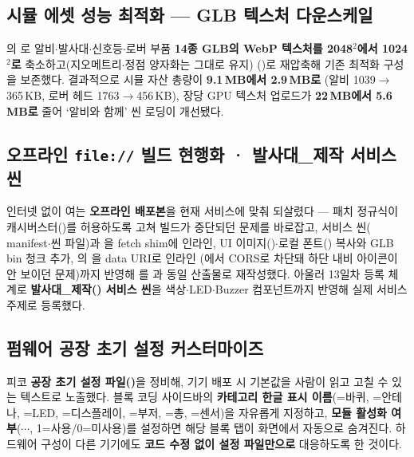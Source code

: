 \subsection{시뮬 에셋 성능 최적화 --- GLB 텍스처 다운스케일}
의 로 알비$\cdot$발사대$\cdot$신호등$\cdot$로버 부품
\textbf{14종 GLB의 WebP 텍스처를 2048$^2$에서 1024$^2$로} 축소하고(지오메트리$\cdot$정점
양자화는 그대로 유지) ()로 재압축해 기존
최적화 구성을 보존했다. 결과적으로 시뮬 자산 총량이 \textbf{9.1\,MB에서 2.9\,MB로}
(알비 1039$\to$365\,KB, 로버 헤드 1763$\to$456\,KB), 장당 GPU 텍스처 업로드가
\textbf{22\,MB에서 5.6\,MB로} 줄어 `알비와 함께' 씬 로딩이 개선됐다.

\subsection{오프라인 \texttt{file://} 빌드 현행화 · 발사대\_제작 서비스 씬}
인터넷 없이 여는 \textbf{오프라인 배포본}을 현재 서비스에 맞춰 되살렸다 --- 
패치 정규식이 캐시버스터()를 허용하도록 고쳐 빌드가 중단되던 문제를
바로잡고, 서비스 씬( manifest$\cdot$씬 파일)과 을
fetch shim에 인라인, UI 이미지()$\cdot$로컬 폰트() 복사와
GLB bin 청크 추가, 의  을 data URI로 인라인
(에서 CORS로 차단돼 하단 내비 아이콘이 안 보이던 문제)까지 반영해
를 과 동일 산출물로 재작성했다. 아울러 13일차 등록 체계로
\textbf{발사대\_제작() 서비스 씬}을 색상$\cdot$LED$\cdot$Buzzer 컴포넌트까지
반영해 실제 서비스 주제로 등록했다.

\subsection{펌웨어 공장 초기 설정 커스터마이즈}
피코 \textbf{공장 초기 설정 파일()}을 정비해, 기기 배포 시 기본값을
사람이 읽고 고칠 수 있는 텍스트로 노출했다. 블록 코딩 사이드바의 \textbf{카테고리 한글
표시 이름}(=바퀴, =안테나, =LED, =디스플레이,
=부저, =총, =센서)을 자유롭게 지정하고, \textbf{모듈
활성화 여부}($\cdots$, 1=사용/0=미사용)를 설정하면
해당 블록 탭이 화면에서 자동으로 숨겨진다. 하드웨어 구성이 다른 기기에도 \textbf{코드
수정 없이 설정 파일만으로} 대응하도록 한 것이다.

